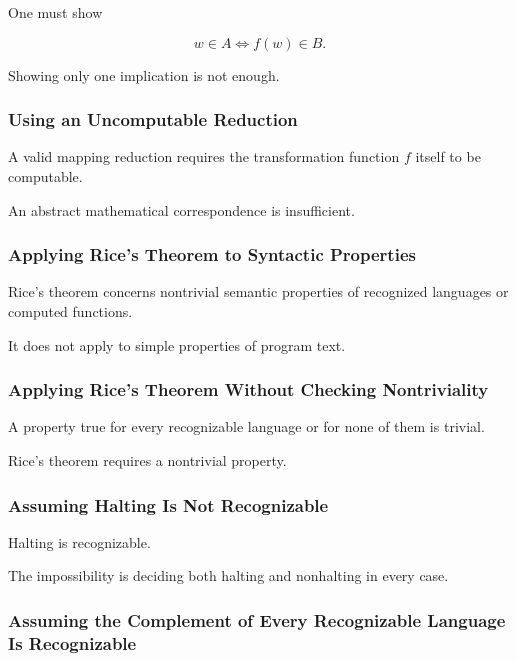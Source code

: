 One must show

\[
\boxed{
w\in A
\iff
f(w)\in B.
}
\]

Showing only one implication is not enough.

\subsubsection{Using an Uncomputable Reduction}

A valid mapping reduction requires the transformation function \(f\) itself
to be computable.

An abstract mathematical correspondence is insufficient.

\subsubsection{Applying Rice's Theorem to Syntactic Properties}

Rice's theorem concerns nontrivial semantic properties of recognized
languages or computed functions.

It does not apply to simple properties of program text.

\subsubsection{Applying Rice's Theorem Without Checking Nontriviality}

A property true for every recognizable language or for none of them is
trivial.

Rice's theorem requires a nontrivial property.

\subsubsection{Assuming Halting Is Not Recognizable}

Halting is recognizable.

The impossibility is deciding both halting and nonhalting in every case.

\subsubsection{Assuming the Complement of Every Recognizable Language Is Recognizable}

